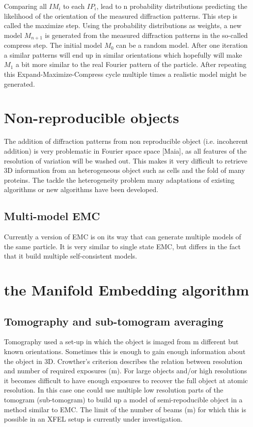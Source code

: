 Comparing all $IM_i$ to each $IP_i$, lead to n probability distributions predicting the likelihood of the orientation of the measured diffraction patterns. This step is called the maximize step. Using the probability distributions as weights, a new model $M_{n+1}$ is generated from the measured diffraction patterns in the so-called compress step. 
The initial model $M_0$ can be a random model. After one iteration a similar patterns will end up in similar orientations which hopefully will make $M_1$ a bit more similar to the real Fourier pattern of the particle. After repeating this Expand-Maximize-Compress cycle multiple times a realistic model might be generated.

\section{Non-reproducible objects}
The addition of diffraction patterns from non reproducible object (i.e. incoherent addition) is very problematic in Fourier space space [Maia], as all features of the resolution of variation will be washed out. This makes it very difficult to retrieve 3D information from an heterogeneous object such as cells and the fold of many proteins. The tackle the heterogeneity problem many adaptations of existing algorithms or new algorithms have been developed.

\subsection{Multi-model EMC}
Currently a version of EMC is on its way that can generate multiple models of the same particle. It is very similar to single state EMC, but differs in the fact that it build multiple self-consistent models. 

\section{the Manifold Embedding algorithm}


\subsection{Tomography and sub-tomogram averaging}
Tomography used a set-up in which the object is imaged from m different but known orientations. Sometimes this is enough to gain enough information about the object in 3D. Crowther's criterion describes the relation between resolution and number of required exposures (m). For large objects and/or high resolutions it becomes difficult to have enough exposures to recover the full object at atomic resolution. In this case one could use multiple low resolution parts of the tomogram (sub-tomogram) to build up a model of semi-repoducible object in a method similar to EMC. The limit of the number of beams (m) for which this is possible in an XFEL setup is currently under investigation.

